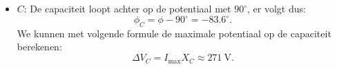 \begin{enumerate}[(a)]
\begin{description}[labelwidth=1.5cm, leftmargin=!]
\begin{itemize}
                    \begin{equation*}
                        \phi_L = \phi + 90^\circ = 96.42^\circ.
                    \end{equation*} 
                    We kunnen met volgende formule de maximale potentiaal op de zelfinductie berekenen:
                    \begin{equation*}
                        \Delta V_L = I_{\text{max}} X_L \approx 233 \ \text{V}.
                    \end{equation*}
                \item $C$:
                    De capaciteit loopt achter op de potentiaal met $90^\circ$, er volgt dus:
                    \begin{equation*}
                        \phi_C = \phi - 90^\circ = -83.6^\circ.
                    \end{equation*}
                    We kunnen met volgende formule de maximale potentiaal op de capaciteit berekenen:
                    \begin{equation*}
                        \Delta V_C = I_{\text{max}} X_C \approx 271 \ \text{V}.
                    \end{equation*}
            \end{itemize}
        \end{description}
\end{enumerate}

\vspace{1cm}